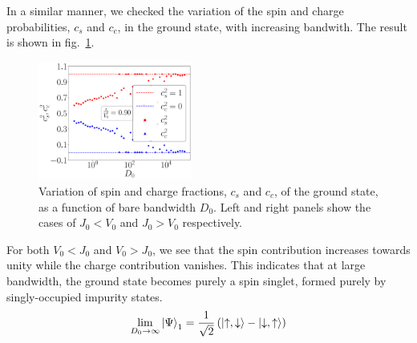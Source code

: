 \documentclass{report}
\numberwithin{equation}{section}
\begin{document}
In a similar manner, we checked the variation of the spin and charge probabilities, \(c_s\) and \(c_c\), in the ground state, with increasing bandwith. The result is shown in fig.~\ref{c_vs_D}.
\begin{figure}[htpb]
	\centering
	\includegraphics[width=0.45\textwidth]{../figures/coeffs_vs_D.pdf}
	\caption{Variation of spin and charge fractions, \(c_s\) and \(c_c\), of the ground state, as a function of bare bandwidth \(D_0\). Left and right panels show the cases of \(J_0 < V_0\) and \(J_0 > V_0\) respectively.}
	\label{c_vs_D}
\end{figure}
For both \(V_0 < J_0\) and \(V_0 > J_0\), we see that the spin contribution increases towards unity while the charge contribution vanishes. This indicates that at large bandwidth, the ground state becomes purely a spin singlet, formed purely by singly-occupied impurity states.
\begin{equation}\begin{aligned}
	\label{gstate_kondo}
	\lim_{D_0 \to \infty} \ket{\Psi}_1 = \frac{1}{\sqrt 2}\left(\ket{\uparrow, \downarrow} - \ket{\downarrow, \uparrow}\right) 
\end{aligned}\end{equation}
\end{document}

